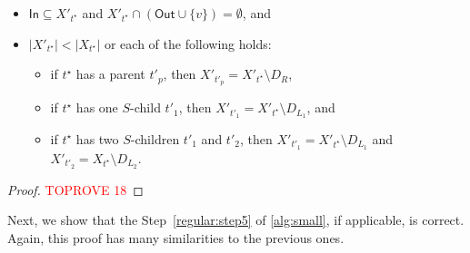 \documentclass[a4paper,UKenglish,cleveref, autoref, thm-restate, numberwithinsect]{lipics-v2021}
\newcommand{\In}{\mathsf{In}}
\newcommand{\Out}{\mathsf{Out}}
\begin{document}
\begin{lemma}
\begin{itemize}
\item $\In\subseteq X'_{t^{\star}}$ and $X'_{t^{\star}}\cap (\Out\cup\{v\})=\emptyset$, and
\item $|X'_{t^{\star}}|<|X_{t^{\star}}|$ or each of the following holds:
\begin{itemize}
    \item if $t^{\star}$ has a parent $t'_p$, then $X'_{t'_p}=X'_{t^{\star}}\setminus D_R$, 
    \item if $t^{\star}$ has one $S$-child $t'_1$, then $X'_{t'_1}=X'_{t^{\star}}\setminus D_{L_1}$, and 
    \item if $t^{\star}$ has two $S$-children $t'_1$ and $t'_2$, then $X'_{t'_1}=X'_{t^{\star}}\setminus D_{L_1}$ and $X'_{t'_2}=X_{t^{\star}}\setminus D_{L_2}$.
\end{itemize}
\end{itemize}
\end{lemma}
\begin{proof}\textcolor{red}{TOPROVE 18}\end{proof}



Next, we show that the Step~\ref{regular:step5} of \cref{alg:small}, if applicable, is correct. Again, this proof has many similarities to the previous ones.
\end{document}
